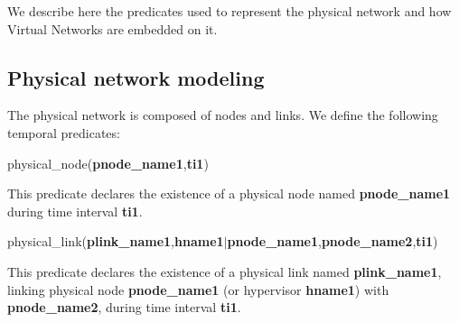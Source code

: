 \label{sec:model-network}
We describe here the predicates used to represent the physical network and how Virtual Networks are embedded on it.




\subsection{Physical network modeling}


The physical network is composed of nodes and links. We define the following temporal predicates:
\begin{myformula}
physical\_node(\textbf{pnode\_name1},\textbf{ti1})
\end{myformula}

This predicate declares the existence of a physical node named \textbf{pnode\_name1} during time interval \textbf{ti1}.
\begin{myformula}
physical\_link(\textbf{plink\_name1},\textbf{hname1}$\vert$\textbf{pnode\_name1},\textbf{pnode\_name2},\textbf{ti1})
\end{myformula}

This predicate declares the existence of a physical link named \textbf{plink\_name1}, linking physical node \textbf{pnode\_name1} (or hypervisor \textbf{hname1}) with \textbf{pnode\_name2}, during time interval \textbf{ti1}.

